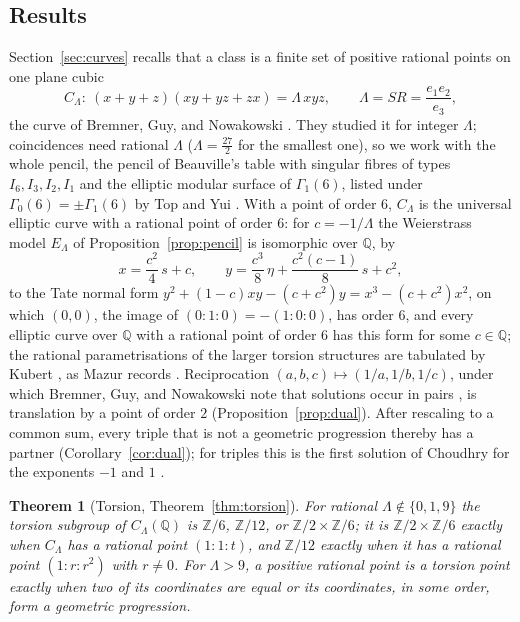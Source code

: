 \documentclass[10pt]{article}
\newcommand{\Q}{\mathbb{Q}}
\newcommand{\Z}{\mathbb{Z}}
\newtheorem{introthm}{Theorem}
\begin{document}
\subsection{Results}
Section~\ref{sec:curves} recalls that a class is a finite set of positive rational points on one plane cubic
\[
  C_\Lambda:\ (x+y+z)(xy+yz+zx)=\Lambda\,xyz,\qquad \Lambda=SR=\frac{e_1e_2}{e_3},
\]
the curve of Bremner, Guy, and Nowakowski \cite{bgn1993}. They studied it for integer $\Lambda$; coincidences need rational $\Lambda$ ($\Lambda=\frac{27}2$ for the smallest one), so we work with the whole pencil, the pencil of Beauville's table with singular fibres of types $I_6,I_3,I_2,I_1$ \cite[Th\'eor\`eme and Tableau, p.~658]{beauville1982} and the elliptic modular surface of $\Gamma_1(6)$, listed under $\Gamma_0(6)=\pm\Gamma_1(6)$ by Top and Yui \cite[Table~2]{topyui2007}. With a point of order $6$, $C_\Lambda$ is the universal elliptic curve with a rational point of order $6$: for $c=-1/\Lambda$ the Weierstrass model $E_\Lambda$ of Proposition~\ref{prop:pencil} is isomorphic over $\Q$, by
\[
  x=\frac{c^2}4\,s+c,\qquad y=\frac{c^3}8\,\eta+\frac{c^2(c-1)}8\,s+c^2,
\]
to the Tate normal form $y^2+(1-c)xy-(c+c^2)y=x^3-(c+c^2)x^2$, on which $(0,0)$, the image of $(0:1:0)=-(1:0:0)$, has order $6$, and every elliptic curve over $\Q$ with a rational point of order $6$ has this form for some $c\in\Q$; the rational parametrisations of the larger torsion structures are tabulated by Kubert \cite{kubert1976}, as Mazur records \cite[p.~156]{mazur1977}. Reciprocation $(a,b,c)\mapsto(1/a,1/b,1/c)$, under which Bremner, Guy, and Nowakowski note that solutions occur in pairs \cite[p.~117]{bgn1993}, is translation by a point of order $2$ (Proposition~\ref{prop:dual}). After rescaling to a common sum, every triple that is not a geometric progression thereby has a partner (Corollary~\ref{cor:dual}); for triples this is the first solution of Choudhry for the exponents $-1$ and $1$ \cite[\S4.1, p.~748]{choudhry2011}.

\begin{introthm}[Torsion, Theorem~\ref{thm:torsion}]\label{thm:T}
For rational $\Lambda\notin\{0,1,9\}$ the torsion subgroup of $C_\Lambda(\Q)$ is $\Z/6$, $\Z/12$, or $\Z/2\times\Z/6$; it is $\Z/2\times\Z/6$ exactly when $C_\Lambda$ has a rational point $(1:1:t)$, and $\Z/12$ exactly when it has a rational point $(1:r:r^2)$ with $r\ne0$. For $\Lambda>9$, a positive rational point is a torsion point exactly when two of its coordinates are equal or its coordinates, in some order, form a geometric progression.
\end{introthm}
\end{document}
